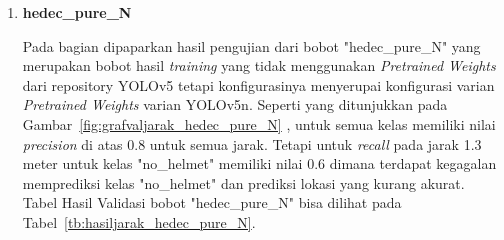 \begin{enumerate}
  \item \textbf{hedec\_pure\_N}
  \par Pada bagian dipaparkan hasil pengujian dari bobot "hedec\_pure\_N" yang merupakan bobot hasil \emph{training}
  yang tidak menggunakan \emph{Pretrained Weights} dari repository YOLOv5 tetapi konfigurasinya menyerupai konfigurasi
  varian \emph{Pretrained Weights} varian YOLOv5n. Seperti yang ditunjukkan pada Gambar~\ref{fig:grafvaljarak_hedec_pure_N}
  , untuk semua kelas memiliki nilai \emph{precision} di atas 0.8 untuk semua jarak. Tetapi untuk \emph{recall} pada jarak 1.3 meter
  untuk kelas "no\_helmet" memiliki nilai 0.6 dimana terdapat kegagalan memprediksi kelas "no\_helmet" dan prediksi lokasi yang
  kurang akurat. Tabel Hasil Validasi bobot "hedec\_pure\_N" bisa dilihat pada Tabel~\ref{tb:hasiljarak_hedec_pure_N}.


\end{enumerate}

